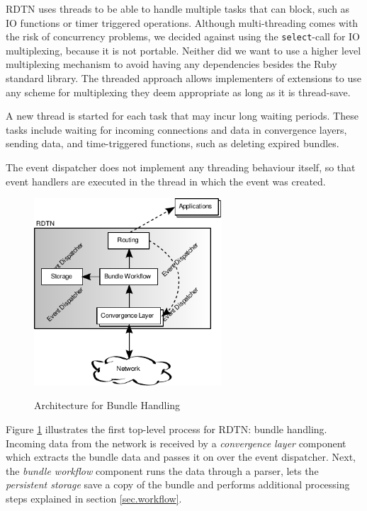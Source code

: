 \documentclass[a4paper]{article}
\begin{document}
RDTN uses threads to be able to handle multiple tasks that can block, such as IO
functions or timer triggered operations. Although multi-threading comes with the
risk of concurrency problems, we decided against using the {\tt select}-call for
IO multiplexing, because it is not portable. Neither did we want to use a higher
level multiplexing mechanism to avoid having any dependencies besides the Ruby
standard library. The threaded approach allows implementers of extensions to use
any scheme for multiplexing they deem appropriate as long as it is thread-save.

A new thread is started for each task that may incur long waiting periods. These
tasks include waiting for incoming connections and data in convergence layers,
sending data, and time-triggered functions, such as deleting expired bundles.

The event dispatcher does not implement any threading behaviour itself, so that
event handlers are executed in the thread in which the event was created.\\

\begin{figure}[h]
\begin{center}
\includegraphics[height=7cm]{bundle-architecture.pdf}\\
\caption{\label{fig.bundle-arch} Architecture for Bundle Handling}
\end{center}
\end{figure}

Figure \ref{fig.bundle-arch} illustrates the first top-level process for RDTN:
bundle handling. Incoming data from the network is received by a {\em
convergence layer} component which extracts the bundle data and passes it on
over the event dispatcher. Next, the {\em bundle workflow} component runs the
data through a parser, lets the {\em persistent storage} save a copy of the
bundle and performs additional processing steps explained in section
\ref{sec.workflow}.
\end{document}
